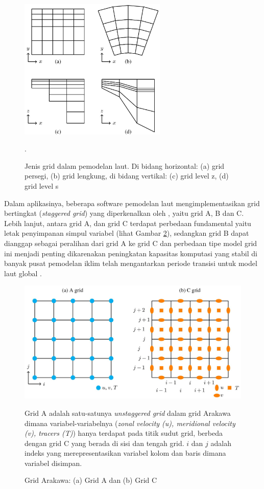 \begin{spacing}{1.5}
	\begin{figure}[H]
		\centering
		\includegraphics[width=7cm]{contents/grid.jpg}
		\caption{Jenis grid dalam pemodelan laut. Di bidang horizontal: (a) grid persegi, (b) grid lengkung, di bidang vertikal: (c) grid level z, (d) grid level s \protect{}}.
		\label{fig:grid}
	\end{figure}
	
	Dalam aplikasinya, beberapa software pemodelan laut mengimplementasikan grid bertingkat (\textit{staggered grid}) yang diperkenalkan oleh , yaitu grid A, B dan C. Lebih lanjut, antara grid A, dan grid C terdapat perbedaan fundamental yaitu letak penyimpanan simpul variabel (lihat Gambar \ref{fig:arakawa}), sedangkan grid B dapat dianggap sebagai peralihan dari grid A ke grid C dan perbedaan tipe model grid ini menjadi penting dikarenakan peningkatan kapasitas komputasi yang stabil di banyak pusat pemodelan iklim telah mengantarkan periode transisi untuk model laut global  . 
	
	\begin{figure}[H]
		\centering
		\includegraphics[width=13cm]{contents/arakawa.jpg}
		\caption{Grid Arakawa: (a) Grid A dan (b) Grid C \protect{}}
		\label{fig:arakawa}
		\medspace
		\small
		Grid A adalah satu-satunya \textit{unstaggered grid} dalam grid Arakawa dimana variabel-variabelnya (\textit{zonal velocity (u), meridional velocity (v), tracers (T)}) hanya terdapat pada titik sudut grid, berbeda dengan grid C yang berada di sisi dan tengah grid. $i$ dan $j$ adalah indeks yang merepresentasikan variabel kolom dan baris dimana variabel disimpan.
	\end{figure}
\end{spacing}
\vspace{-0.1pc}
